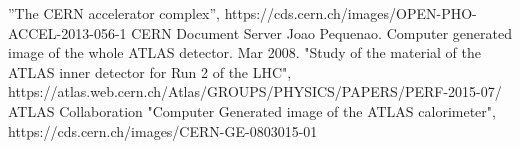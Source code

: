 \begin{thebibliography}{24}
”The CERN accelerator complex”, https://cds.cern.ch/images/OPEN-PHO-ACCEL-2013-056-1 CERN Document Server
Joao Pequenao. Computer generated image of the whole ATLAS detector. Mar 2008.
"Study of the material of the ATLAS inner detector for Run 2 of the LHC", https://atlas.web.cern.ch/Atlas/GROUPS/PHYSICS/PAPERS/PERF-2015-07/ ATLAS Collaboration
"Computer Generated image of the ATLAS calorimeter", https://cds.cern.ch/images/CERN-GE-0803015-01
\end{thebibliography}
